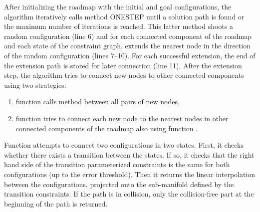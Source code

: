 After initializing the roadmap with the initial and goal configurations, the algorithm iteratively calls method {\scriptsize ONE}{\small S}{\scriptsize TEP} until a solution path is found or the maximum number of iterations is reached.
This latter method shoots a random configuration (line 6) and for each connected component of the roadmap and each state of the constraint graph, extends the nearest node in the direction of the random configuration (lines 7--10). For each successful extension, the end of the extension path is stored for later connection (line 11). After the extension step, the algorithm tries to connect new nodes to other connected components using two strategies:
\begin{enumerate}
\item function \TRYCONNECTNEWNODES calls method \CONNECT between all pairs of new nodes,
\item function \TRYCONNECTTOROADMAP tries to connect each new node to the nearest nodes in other connected components of the roadmap also using function \CONNECT.
\end{enumerate}
Function \CONNECT attempts to connect two configurations in two states. First, it checks whether there exists a transition between the states. If so, it checks that the right hand side of the transition parameterized constraints is the same for both configurations (up to the error threshold). Then it returns the linear interpolation between the configurations, projected onto the sub-manifold defined by the transition constraints. If the path is in collision, only the collision-free part at the beginning of the path is returned.

